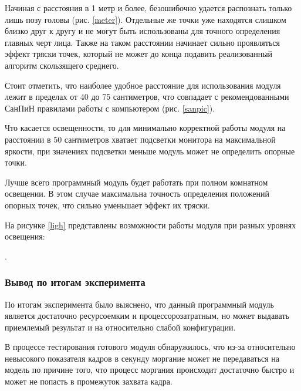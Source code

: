 
Начиная с расстояния в 1 метр и более, безошибочно удается распознать только лишь позу головы (рис. \ref{meter}). Отдельные же точки уже находятся слишком близко друг к другу и не могут быть использованы для точного определения главных черт лица. Также на таком расстоянии начинает сильно проявляться эффект тряски точек, который не может до конца подавить реализованный алгоритм скользящего среднего.


Стоит отметить, что наиболее удобное расстояние для использования модуля лежит в пределах от 40 до 75 сантиметров, что совпадает с рекомендованными СанПиН правилами работы с компьютером \cite{sanpindoc} (рис. \ref{sanpic}).


Что касается освещенности, то для минимально корректной работы модуля на расстоянии в 50 сантиметров хватает подсветки монитора на максимальной яркости, при значениях подсветки меньше модуль может не определить опорные точки. 

Лучше всего программный модуль будет работать при полном комнатном освещении. В этом случае максимальна точность определения положений опорных точек, что сильно уменьшает эффект их тряски.

На рисунке \ref{ligh} представлены возможности работы модуля при разных уровнях освещения:

.

\subsubsection {Вывод по итогам эксперимента}
По итогам эксперимента было выяснено, что данный программный модуль является достаточно ресурсоемким и процессорозатратным, но может выдавать приемлемый результат и на относительно слабой конфигурации.

В процессе тестирования готового модуля обнаружилось, что из-за относительно невысокого показателя кадров  в секунду моргание может не передаваться на модель по причине  того, что процесс моргания происходит достаточно быстро и может не попасть в промежуток захвата кадра.

